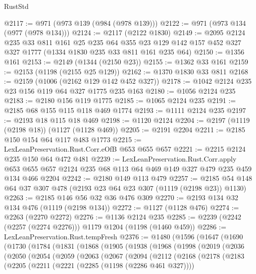 \begin{lexlean}{RustStd}
\begin{coremodule}
@2117 := @971 (@973 @139 (@984 (@978 @139)))
@2122 := @971 (@973 @134 (@977 (@978 @134)))
@2124 := @2117 (@2122 @1830)
@2149 := @2095
    @2124
    @235
    @33
    @811
    @161
    @25
    @235
    @64
    @355
    @23
    @129
    @142
    @157
    @452
    @327
    @327
    @1777
    (@1334 @1830 @235 @33 @811 @161 @235 @64)
@2150 := @1356 @161
@2153 := @2149 (@1344 (@2150 @23))
@2155 := @1362 @33 @161
@2159 := @2153 (@1198 (@2155 @25 @129))
@2162 := @1370 @1830 @33 @811
@2168 := @2159 (@1006 (@2162 @129 @142 @452 @327))
@2178 := @1042 @2124 @235 @23 @156 @119 @64 @327 @1775 @235 @163
@2180 := @1056 @2124 @235
@2183 := @2180 @156 @119 @1775
@2185 := @1065 @2124 @235
@2191 := @2185 @68 @155 @115 @118 @469 @1774
@2193 := @1111 @2124 @235
@2197 := @2193 @18 @115 @18 @469
@2198 := @1120 @2124
@2204 := @2197 (@1119 (@2198 @18)) (@1127 (@1128 @469))
@2205 := @2191 @2204
@2211 := @2185 @150 @154 @64 @117 @483 @1773
@2215 := LexLeanPreservation.Rust.Corr.eOfB @653 @655 @657
@2221 := @2215 @2124 @235 @150 @64 @472 @481
@2239 := LexLeanPreservation.Rust.Corr.apply
    @653
    @655
    @657
    @2124
    @235
    @68
    @113
    @64
    @469
    @149
    @327
    @479
    @235
    @459
    @134
    @466
    @2204
@2242 := @2180 @149 @113 @479
@2257 := @2185 @54 @148 @64 @37 @307 @478 (@2193 @23 @64 @23 @307 (@1119 (@2198 @23)) @1130)
@2263 := @2185 @146 @56 @32 @36 @476 @309
@2270 := @2193 @134 @32 @134 @476 (@1119 (@2198 @134))
@2272 := @1127 (@1128 @476)
@2274 := @2263 (@2270 @2272)
@2276 := @1136 @2124 @235
@2285 := @2239 (@2242 (@2257 (@2274 @2276))) @1179 @1204 (@1198 (@1460 @459))
@2286 := LexLeanPreservation.Rust.tempFresh
@2376 := @1480
    (@1596
      (@1647
        (@1690
          (@1730
            (@1784
              (@1831
                (@1868
                  (@1905
                    (@1938
                      (@1968
                        (@1998
                          (@2019
                            (@2036
                              (@2050
                                (@2054
                                  (@2059
                                    (@2063
                                      (@2067
                                        (@2094
                                          (@2112
                                            (@2168
                                              (@2178
                                                (@2183
                                                  (@2205
                                                    (@2211
                                                      (@2221 (@2285 (@1198 (@2286 @461 @327))))

\end{coremodule}
\end{lexlean}
